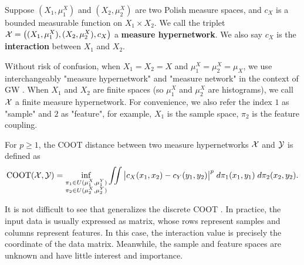 \begin{definition}
Suppose $(X_1, \mu_1^X)$ and $(X_2, \mu_2^X)$ are two Polish measure spaces,
and $c_X$ is a bounded measurable function on $X_1 \times X_2$.
We call the triplet $\mathcal X = \big((X_1, \mu_1^X), (X_2, \mu_2^X), c_X \big)$
a \textbf{measure hypernetwork}. We also say $c_X$ is the \textbf{interaction}
between $X_1$ and $X_2$.
\end{definition}
Without risk of confusion, when $X_1 = X_2 = X$ and $\mu_1^X = \mu_2^X = \mu_X$,
we use interchangeably "measure hypernetwork" and "measure network" in
the context of GW \citep{Chowdhury19}.
When $X_1$ and $X_2$ are finite spaces (so $\mu_1^X$ and $\mu_2^X$ are histograms),
we call $\mathcal X$ a finite measure hypernetwork. For convenience, we also refer the index $1$ as "sample"
and $2$ as "feature", for example, $X_1$ is the sample space, $\pi_2$ is the feature coupling.
\begin{definition}
  \label{def:cont_coot}
  For $p \geq 1$, the COOT distance between two measure hypernetworks $\mathcal X$ and $\mathcal Y$ is defined as
  \begin{align} \label{eq:cont_coot}
    \text{COOT}(\mathcal X, \mathcal Y) =
    \inf_{\substack{\pi_1 \in U(\mu^X_1, \mu^Y_1) \\
    \pi_2 \in U(\mu^X_2, \mu^Y_2)}} \iint
    \big\vert c_X(x_1, x_2) - c_Y(y_1, y_2) \big\vert^p \; d\pi_1(x_1, y_1) \; d\pi_2(x_2, y_2).
  \end{align}
\end{definition}
It is not difficult to see that  generalizes the discrete COOT \citep{Redko20}.
In practice, the input data is usually expressed as matrix,
whose rows represent samples and columns represent features.
In this case, the interaction value is precisely the coordinate of the data matrix.
Meanwhile, the sample and feature spaces are unknown and have little interest and importance.

